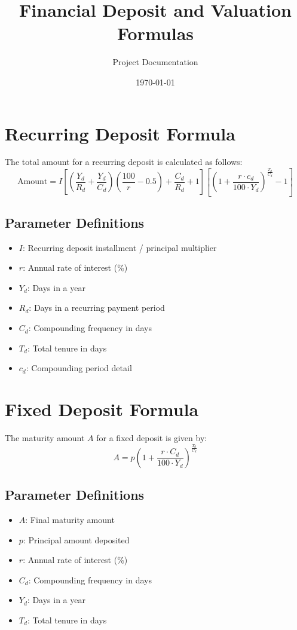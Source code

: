 \documentclass[12pt]{article}
\title{\textbf{Financial Deposit and Valuation Formulas}}
\author{Project Documentation}
\date{\today}
\begin{document}
\maketitle

\section{Recurring Deposit Formula}
The total amount for a recurring deposit is calculated as follows:
\[
\text{Amount} = I \left[ \left( \frac{Y_d}{R_d} + \frac{Y_d}{C_d} \right) \left( \frac{100}{r} - 0.5 \right) + \frac{C_d}{R_d} + 1 \right] \left[ \left( 1 + \frac{r \cdot c_d}{100 \cdot Y_d} \right)^{\frac{T_d}{C_d}} - 1 \right]
\]

\subsection*{Parameter Definitions}
\begin{itemize}
    \item $I$: Recurring deposit installment / principal multiplier
    \item $r$: Annual rate of interest (\%)
    \item $Y_d$: Days in a year
    \item $R_d$: Days in a recurring payment period
    \item $C_d$: Compounding frequency in days
    \item $T_d$: Total tenure in days
    \item $c_d$: Compounding period detail
\end{itemize}

\section{Fixed Deposit Formula}
The maturity amount $A$ for a fixed deposit is given by:
\[
A = p \left( 1 + \frac{r \cdot C_d}{100 \cdot Y_d} \right)^{\frac{T_d}{C_d}}
\]

\subsection*{Parameter Definitions}
\begin{itemize}
    \item $A$: Final maturity amount
    \item $p$: Principal amount deposited
    \item $r$: Annual rate of interest (\%)
    \item $C_d$: Compounding frequency in days
    \item $Y_d$: Days in a year
    \item $T_d$: Total tenure in days
\end{itemize}
\end{document}
